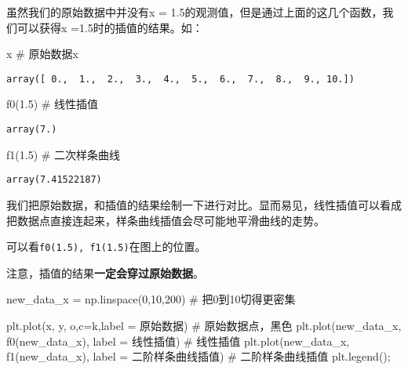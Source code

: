 \documentclass[
  letterpaper,
  DIV=11,
  numbers=noendperiod]{scrreprt}
\newenvironment{Shaded}{\begin{snugshade}}{\end{snugshade}}
\newcommand{\CommentTok}[1]{\textcolor[rgb]{0.37,0.37,0.37}{#1}}
\newcommand{\DecValTok}[1]{\textcolor[rgb]{0.68,0.00,0.00}{#1}}
\newcommand{\FloatTok}[1]{\textcolor[rgb]{0.68,0.00,0.00}{#1}}
\newcommand{\NormalTok}[1]{\textcolor[rgb]{0.00,0.23,0.31}{#1}}
\newcommand{\OperatorTok}[1]{\textcolor[rgb]{0.37,0.37,0.37}{#1}}
\newcommand{\StringTok}[1]{\textcolor[rgb]{0.13,0.47,0.30}{#1}}
\begin{document}
虽然我们的原始数据中并没有x =
1.5的观测值，但是通过上面的这几个函数，我们可以获得x
=1.5时的插值的结果。如：

\begin{Shaded}
\begin{Highlighting}[]
\NormalTok{x }\CommentTok{\# 原始数据x}
\end{Highlighting}
\end{Shaded}

\begin{verbatim}
array([ 0.,  1.,  2.,  3.,  4.,  5.,  6.,  7.,  8.,  9., 10.])
\end{verbatim}

\begin{Shaded}
\begin{Highlighting}[]
\NormalTok{f0(}\FloatTok{1.5}\NormalTok{) }\CommentTok{\# 线性插值}
\end{Highlighting}
\end{Shaded}

\begin{verbatim}
array(7.)
\end{verbatim}

\begin{Shaded}
\begin{Highlighting}[]
\NormalTok{f1(}\FloatTok{1.5}\NormalTok{) }\CommentTok{\# 二次样条曲线}
\end{Highlighting}
\end{Shaded}

\begin{verbatim}
array(7.41522187)
\end{verbatim}

我们把原始数据，和插值的结果绘制一下进行对比。显而易见，线性插值可以看成把数据点直接连起来，样条曲线插值会尽可能地平滑曲线的走势。

可以看\texttt{f0(1.5),\ f1(1.5)}在图上的位置。

注意，插值的结果\textbf{一定会穿过原始数据}。

\begin{Shaded}
\begin{Highlighting}[]
\NormalTok{new\_data\_x }\OperatorTok{=}\NormalTok{ np.linspace(}\DecValTok{0}\NormalTok{,}\DecValTok{10}\NormalTok{,}\DecValTok{200}\NormalTok{) }\CommentTok{\# 把0到10切得更密集}

\NormalTok{plt.plot(x, y, }\StringTok{\textquotesingle{}o\textquotesingle{}}\NormalTok{,c}\OperatorTok{=}\StringTok{\textquotesingle{}k\textquotesingle{}}\NormalTok{,label }\OperatorTok{=} \StringTok{\textquotesingle{}原始数据\textquotesingle{}}\NormalTok{) }\CommentTok{\# 原始数据点，黑色}
\NormalTok{plt.plot(new\_data\_x, f0(new\_data\_x), label }\OperatorTok{=} \StringTok{\textquotesingle{}线性插值\textquotesingle{}}\NormalTok{) }\CommentTok{\# 线性插值}
\NormalTok{plt.plot(new\_data\_x, f1(new\_data\_x), label }\OperatorTok{=} \StringTok{\textquotesingle{}二阶样条曲线插值\textquotesingle{}}\NormalTok{) }\CommentTok{\# 二阶样条曲线插值}
\NormalTok{plt.legend()}\OperatorTok{;}
\end{Highlighting}
\end{Shaded}
\end{document}
